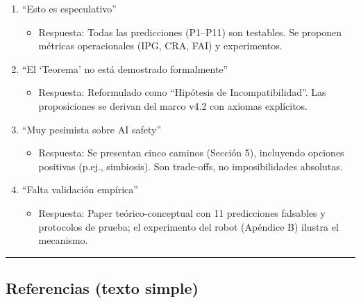 \begin{enumerate}
\def\labelenumi{\arabic{enumi})}
\tightlist
\item
  ``Esto es especulativo''

  \begin{itemize}
  \tightlist
  \item
    Respuesta: Todas las predicciones (P1--P11) son testables. Se
    proponen métricas operacionales (IPG, CRA, FAI) y experimentos.
  \end{itemize}
\item
  ``El `Teorema' no está demostrado formalmente''

  \begin{itemize}
  \tightlist
  \item
    Respuesta: Reformulado como ``Hipótesis de Incompatibilidad''. Las
    proposiciones se derivan del marco v4.2 con axiomas explícitos.
  \end{itemize}
\item
  ``Muy pesimista sobre AI safety''

  \begin{itemize}
  \tightlist
  \item
    Respuesta: Se presentan cinco caminos (Sección 5), incluyendo
    opciones positivas (p.ej., simbiosis). Son trade-offs, no
    imposibilidades absolutas.
  \end{itemize}
\item
  ``Falta validación empírica''

  \begin{itemize}
  \tightlist
  \item
    Respuesta: Paper teórico-conceptual con 11 predicciones falsables y
    protocolos de prueba; el experimento del robot (Apéndice B) ilustra
    el mecanismo.
  \end{itemize}
\end{enumerate}

\begin{center}\rule{0.5\linewidth}{0.5pt}\end{center}

\subsection{Referencias (texto simple)}\label{referencias-texto-simple}

